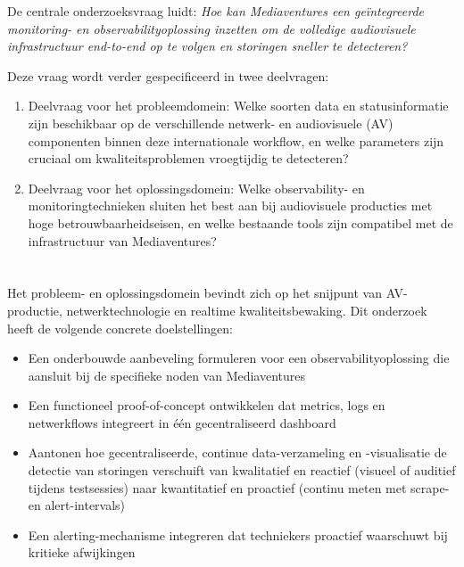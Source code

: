 De centrale onderzoeksvraag luidt: \textit{Hoe kan Mediaventures een geïntegreerde monitoring- en observabilityoplossing inzetten om de volledige audiovisuele infrastructuur end-to-end op te volgen en storingen sneller te detecteren?}

Deze vraag wordt verder gespecificeerd in twee deelvragen:

\begin{enumerate}
\item Deelvraag voor het probleemdomein: Welke soorten data en statusinformatie zijn beschikbaar op de verschillende netwerk- en audiovisuele (AV) componenten binnen deze internationale workflow, en welke parameters zijn cruciaal om kwaliteitsproblemen vroegtijdig te detecteren?

\item Deelvraag voor het oplossingsdomein: Welke observability- en monitoringtechnieken sluiten het best aan bij audiovisuele producties met hoge betrouwbaarheidseisen, en welke bestaande tools zijn compatibel met de infrastructuur van Mediaventures?
\end{enumerate}

\section{}%
\label{sec:onderzoeksdoelstelling}

Het probleem- en oplossingsdomein bevindt zich op het snijpunt van AV-productie, netwerktechnologie en realtime kwaliteitsbewaking. Dit onderzoek heeft de volgende concrete doelstellingen:

\begin{itemize}
\item Een onderbouwde aanbeveling formuleren voor een observabilityoplossing die aansluit bij de specifieke noden van Mediaventures
\item Een functioneel proof-of-concept ontwikkelen dat metrics, logs en netwerkflows integreert in één gecentraliseerd dashboard
\item Aantonen hoe gecentraliseerde, continue data-verzameling en -visualisatie de detectie van storingen verschuift van kwalitatief en reactief (visueel of auditief tijdens testsessies) naar kwantitatief en proactief (continu meten met scrape- en alert-intervals)
\item Een alerting-mechanisme integreren dat techniekers proactief waarschuwt bij kritieke afwijkingen
\end{itemize}

